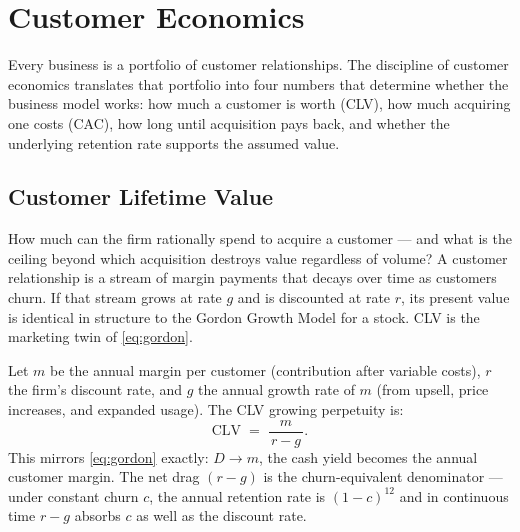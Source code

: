 \chapter{Customer Economics}\label{ch:customer-economics}


Every business is a portfolio of customer relationships. The discipline of customer economics translates that portfolio into four numbers that determine whether the business model works: how much a customer is worth (CLV), how much acquiring one costs (CAC), how long until acquisition pays back, and whether the underlying retention rate supports the assumed value.

\section{Customer Lifetime Value}\label{sec:clv}

How much can the firm rationally spend to acquire a customer --- and what is the ceiling beyond which acquisition destroys value regardless of volume? A customer relationship is a stream of margin payments that decays over time as customers churn. If that stream grows at rate \(g\) and is discounted at rate \(r\), its present value is identical in structure to the Gordon Growth Model for a stock. CLV is the marketing twin of \cref{eq:gordon}.

Let \(m\) be the annual margin per customer (contribution after variable costs), \(r\) the firm's discount rate, and \(g\) the annual growth rate of \(m\) (from upsell, price increases, and expanded usage). The CLV growing perpetuity is:
\begin{equation}\label{eq:clv}
  \mathrm{CLV} \;=\; \frac{m}{\,r - g\,} .
\end{equation}
This mirrors \cref{eq:gordon} exactly: \(D \to m\), the cash yield becomes the annual customer margin. The net drag \((r-g)\) is the churn-equivalent denominator --- under constant churn \(c\), the annual retention rate is \((1-c)^{12}\) and in continuous time \(r-g\) absorbs \(c\) as well as the discount rate.

